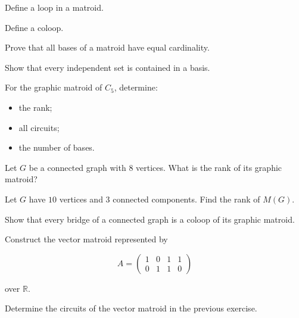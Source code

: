 \begin{exercise}[1]
Define a loop in a matroid.
\end{exercise}

\begin{exercise}[1]
Define a coloop.
\end{exercise}

\begin{exercise}[2]
Prove that all bases of a matroid have equal cardinality.
\end{exercise}

\begin{exercise}[2]
Show that every independent set is contained in a basis.
\end{exercise}

\begin{exercise}[2]
For the graphic matroid of \(C_5\), determine:
\begin{itemize}
    \item the rank;
    \item all circuits;
    \item the number of bases.
\end{itemize}
\end{exercise}

\begin{exercise}[2]
Let \(G\) be a connected graph with \(8\) vertices. What is the rank of
its graphic matroid?
\end{exercise}

\begin{exercise}[2]
Let \(G\) have \(10\) vertices and \(3\) connected components. Find the
rank of \(M(G)\).
\end{exercise}

\begin{exercise}[2]
Show that every bridge of a connected graph is a coloop of its graphic
matroid.
\end{exercise}

\begin{exercise}[2]
Construct the vector matroid represented by

\[
A=
\begin{pmatrix}
1&0&1&1\\
0&1&1&0
\end{pmatrix}
\]

over \(\mathbb{R}\).
\end{exercise}

\begin{exercise}[2]
Determine the circuits of the vector matroid in the previous exercise.
\end{exercise}

